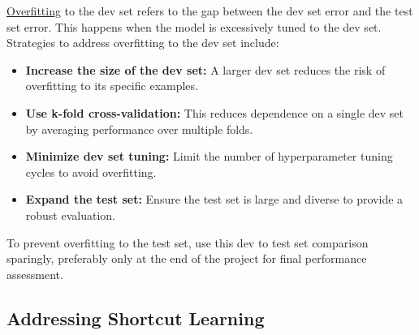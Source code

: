 \documentclass[12pt,openany, draft]{book}
\begin{document}
\hyperref[subsec:overfitting]{Overfitting} to the dev set refers to the gap between the dev set error and the test set error. This happens when the model is excessively tuned to the dev set. Strategies to address overfitting to the dev set include:
\begin{itemize}
    \item \textbf{Increase the size of the dev set:} A larger dev set reduces the risk of overfitting to its specific examples.
    \item \textbf{Use k-fold cross-validation:} This reduces dependence on a single dev set by averaging performance over multiple folds.
    \item \textbf{Minimize dev set tuning:} Limit the number of hyperparameter tuning cycles to avoid overfitting.
    \item \textbf{Expand the test set:} Ensure the test set is large and diverse to provide a robust evaluation.
\end{itemize}

\begin{notebox}
To prevent overfitting to the test set, use this dev to test set comparison sparingly, preferably only at the end of the project for final performance assessment.
\end{notebox}

\subsection{Addressing Shortcut Learning}
\end{document}
